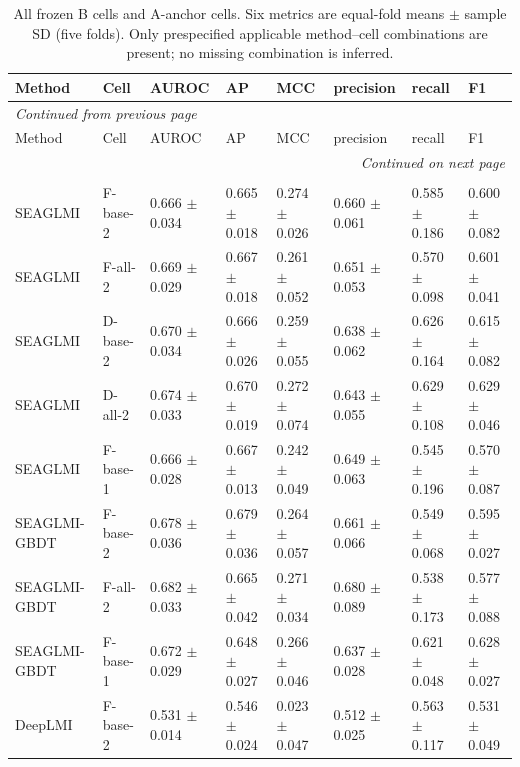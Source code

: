 \begin{landscape}
{\scriptsize
\setlength{\tabcolsep}{4pt}
\renewcommand{\arraystretch}{1.08}
\begin{longtable}{llllllll}
\caption{All frozen B cells and A-anchor cells. Six metrics are equal-fold means $\pm$ sample SD (five folds). Only prespecified applicable method--cell combinations are present; no missing combination is inferred.}\label{tab:screened-B-cells}\\
\toprule
Method & Cell & AUROC & AP & MCC & precision & recall & F1 \\
\midrule
\endfirsthead
\multicolumn{8}{l}{\textit{Continued from previous page}}\\
\toprule
Method & Cell & AUROC & AP & MCC & precision & recall & F1 \\
\midrule
\endhead
\midrule
\multicolumn{8}{r}{\textit{Continued on next page}}\\
\endfoot
\bottomrule
\endlastfoot
\multicolumn{8}{l}{\textit{Strict | Inherited warm split | outer 1:1}}\\
SEAGLMI & F-base-2 & 0.666 $\pm$ 0.034 & 0.665 $\pm$ 0.018 & 0.274 $\pm$ 0.026 & 0.660 $\pm$ 0.061 & 0.585 $\pm$ 0.186 & 0.600 $\pm$ 0.082 \\
SEAGLMI & F-all-2 & 0.669 $\pm$ 0.029 & 0.667 $\pm$ 0.018 & 0.261 $\pm$ 0.052 & 0.651 $\pm$ 0.053 & 0.570 $\pm$ 0.098 & 0.601 $\pm$ 0.041 \\
SEAGLMI & D-base-2 & 0.670 $\pm$ 0.034 & 0.666 $\pm$ 0.026 & 0.259 $\pm$ 0.055 & 0.638 $\pm$ 0.062 & 0.626 $\pm$ 0.164 & 0.615 $\pm$ 0.082 \\
SEAGLMI & D-all-2 & 0.674 $\pm$ 0.033 & 0.670 $\pm$ 0.019 & 0.272 $\pm$ 0.074 & 0.643 $\pm$ 0.055 & 0.629 $\pm$ 0.108 & 0.629 $\pm$ 0.046 \\
SEAGLMI & F-base-1 & 0.666 $\pm$ 0.028 & 0.667 $\pm$ 0.013 & 0.242 $\pm$ 0.049 & 0.649 $\pm$ 0.063 & 0.545 $\pm$ 0.196 & 0.570 $\pm$ 0.087 \\
SEAGLMI-GBDT & F-base-2 & 0.678 $\pm$ 0.036 & 0.679 $\pm$ 0.036 & 0.264 $\pm$ 0.057 & 0.661 $\pm$ 0.066 & 0.549 $\pm$ 0.068 & 0.595 $\pm$ 0.027 \\
SEAGLMI-GBDT & F-all-2 & 0.682 $\pm$ 0.033 & 0.665 $\pm$ 0.042 & 0.271 $\pm$ 0.034 & 0.680 $\pm$ 0.089 & 0.538 $\pm$ 0.173 & 0.577 $\pm$ 0.088 \\
SEAGLMI-GBDT & F-base-1 & 0.672 $\pm$ 0.029 & 0.648 $\pm$ 0.027 & 0.266 $\pm$ 0.046 & 0.637 $\pm$ 0.028 & 0.621 $\pm$ 0.048 & 0.628 $\pm$ 0.027 \\
DeepLMI & F-base-2 & 0.531 $\pm$ 0.014 & 0.546 $\pm$ 0.024 & 0.023 $\pm$ 0.047 & 0.512 $\pm$ 0.025 & 0.563 $\pm$ 0.117 & 0.531 $\pm$ 0.049 \\

\end{longtable}}
\end{landscape}
